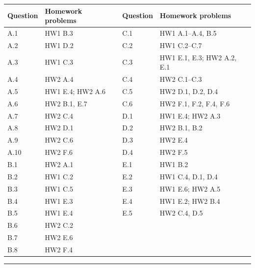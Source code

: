 \documentclass[11pt]{article}
\newcounter{prob}[section]
\begin{document}
\begin{center}
\renewcommand{\arraystretch}{1.2}
\small
\begin{tabular}{@{}l l @{\qquad\qquad} l l@{}}
\toprule
\textbf{Question} & \textbf{Homework problems} &
\textbf{Question} & \textbf{Homework problems} \\
\midrule
A.1  & HW1 B.3            & C.1 & HW1 A.1--A.4, B.5 \\
A.2  & HW1 D.2            & C.2 & HW1 C.2--C.7 \\
A.3  & HW1 C.3            & C.3 & HW1 E.1, E.3; HW2 A.2, E.1 \\
A.4  & HW2 A.4            & C.4 & HW2 C.1--C.3 \\
A.5  & HW1 E.4; HW2 A.6   & C.5 & HW2 D.1, D.2, D.4 \\
A.6  & HW2 B.1, E.7       & C.6 & HW2 F.1, F.2, F.4, F.6 \\
A.7  & HW2 C.4            & D.1 & HW1 E.4; HW2 A.3 \\
A.8  & HW2 D.1            & D.2 & HW2 B.1, B.2 \\
A.9  & HW2 C.6            & D.3 & HW2 E.4 \\
A.10 & HW2 F.6            & D.4 & HW2 F.5 \\
\addlinespace
B.1  & HW2 A.1            & E.1 & HW1 B.2 \\
B.2  & HW1 C.2            & E.2 & HW1 C.4, D.1, D.4 \\
B.3  & HW1 C.5            & E.3 & HW1 E.6; HW2 A.5 \\
B.4  & HW1 E.3            & E.4 & HW1 E.2; HW2 B.4 \\
B.5  & HW1 E.4            & E.5 & HW2 C.4, D.5 \\
B.6  & HW2 C.2            &     & \\
B.7  & HW2 E.6            &     & \\
B.8  & HW2 F.4            &     & \\
\bottomrule
\end{tabular}
\end{center}

\vfill
\noindent\rule{\textwidth}{0.4pt}

\smallskip
{}
\end{document}
